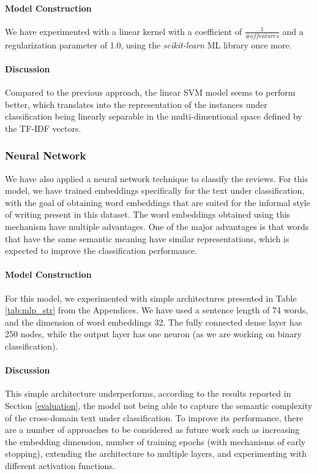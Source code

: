\paragraph{Model Construction}
We have experimented with a linear kernel with a coefficient of $\frac{1}{\# of features}$ and a regularization parameter of 1.0, using the \textit{scikit-learn} ML library once more.

\paragraph{Discussion}
Compared to the previous approach, the linear SVM model seems to perform better, which translates into the representation of the instances under classification being linearly separable in the multi-dimentional space defined by the TF-IDF vectors.

\subsubsection{Neural Network}
We have also applied a neural network technique to classify the reviews. For this model, we have trained embeddings specifically for the text under classification, with the goal of obtaining word embeddings that are suited for the informal style of writing present in this dataset.
The word embeddings obtained using this mechanism have multiple advantages. One of the major advantages is that words that have the same semantic meaning have similar representations, which is expected to improve the classification performance.

\paragraph{Model Construction}
For this model, we experimented with simple architectures presented in Table \ref{tab:mlp_str} from the Appendices. We have used a sentence length of 74 words, and the dimension of word embeddings 32. The fully connected dense layer has 250 nodes, while the output layer has one neuron (as we are working on binary classification). 

\paragraph{Discussion}
This simple architecture underperforms, according to the results reported in Section \ref{evaluation}, the model not being able to capture the semantic complexity of the cross-domain text under classification. To improve its performance, there are a number of approaches to be considered as future work such as increasing the embedding dimension, number of training epochs (with mechanisms of early stopping), extending the architecture to multiple layers, and experimenting with different activation functions.

